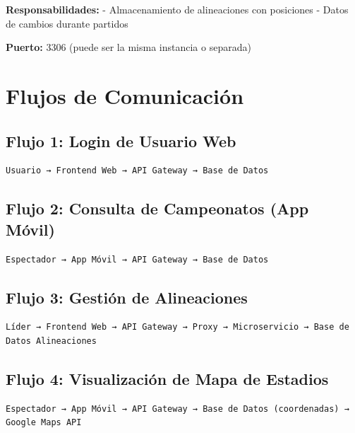 \documentclass[
  spanish,
  11pt,
  letterpaper,
]{book}
\begin{document}
\textbf{Responsabilidades:} - Almacenamiento de alineaciones con
posiciones - Datos de cambios durante partidos

\textbf{Puerto:} 3306 (puede ser la misma instancia o separada)

\section{Flujos de Comunicación}\label{flujos-de-comunicaciuxf3n}

\subsection{Flujo 1: Login de Usuario
Web}\label{flujo-1-login-de-usuario-web}

\begin{verbatim}
Usuario → Frontend Web → API Gateway → Base de Datos
\end{verbatim}

\subsection{Flujo 2: Consulta de Campeonatos (App
Móvil)}\label{flujo-2-consulta-de-campeonatos-app-muxf3vil}

\begin{verbatim}
Espectador → App Móvil → API Gateway → Base de Datos
\end{verbatim}

\subsection{Flujo 3: Gestión de
Alineaciones}\label{flujo-3-gestiuxf3n-de-alineaciones}

\begin{verbatim}
Líder → Frontend Web → API Gateway → Proxy → Microservicio → Base de Datos Alineaciones
\end{verbatim}

\subsection{Flujo 4: Visualización de Mapa de
Estadios}\label{flujo-4-visualizaciuxf3n-de-mapa-de-estadios}

\begin{verbatim}
Espectador → App Móvil → API Gateway → Base de Datos (coordenadas) → Google Maps API
\end{verbatim}
\end{document}
